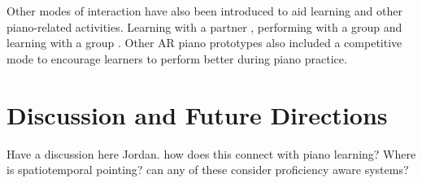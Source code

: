 \documentclass[sigchi, review]{acmart}
\begin{document}

Other modes of interaction have also been introduced to aid learning and other piano-related activities. Learning with a partner \cite{xiao2011duet}, performing with a group \cite{gerry2019adept} and learning with a group \cite{cai2019design}. Other AR piano prototypes also included a competitive mode \cite{cai2019design} to encourage learners to perform better during piano practice. 

\section{Discussion and Future Directions}
Have a discussion here Jordan. how does this connect with piano learning? 
Where is spatiotemporal pointing?
can any of these consider proficiency aware systems? 
\label{sec: discuss}





\balance


\end{document}
